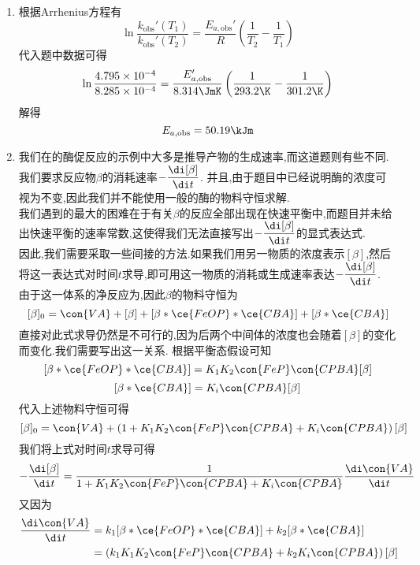 \documentclass{ctexart}
\begin{document}
\begin{solution}
    \begin{enumerate}[label=\tbf{\arabic{Pcounter}-\arabic*},topsep=0pt,parsep=0pt,itemsep=0pt,partopsep=0pt]
        \item 根据Arrhenius方程有
            \[\ln\dfrac{k_{\text{obs}}'\left(T_1\right)}{k_{\text{obs}}'\left(T_2\right)}=\dfrac{E_{a,\text{obs}}'}{R}\left(\dfrac{1}{T_2}-\dfrac{1}{T_1}\right)\]
            代入题中数据可得
            \[\ln\dfrac{4.795\times10^{-4}}{8.285\times10^{-4}}=\dfrac{E_{a,\text{obs}}'}{8.314\JmK}\left(\dfrac{1}{293.2\K}-\dfrac{1}{301.2\K}\right)\]
            解得
            \[E_{a,\text{obs}}=50.19\kJm\]
        \item 我们在的酶促反应的示例中大多是推导产物的生成速率,而这道题则有些不同.我们要求反应物$\beta$的消耗速率$-\dfrac{\di[\beta]}{\di t}$.%
            并且,由于题目中已经说明酶的浓度可视为不变,因此我们并不能使用一般的酶的物料守恒求解.\\
            我们遇到的最大的困难在于有关$\beta$的反应全部出现在快速平衡中,而题目并未给出快速平衡的速率常数,这使得我们无法直接写出$-\dfrac{\di[\beta]}{\di t}$的显式表达式.\\
            因此,我们需要采取一些间接的方法.如果我们用另一物质的浓度表示$[\beta]$,然后将这一表达式对时间$t$求导,即可用这一物质的消耗或生成速率表达$-\dfrac{\di[\beta]}{\di t}$.\\
            由于这一体系的净反应为,因此$\beta$的物料守恒为
            \[[\beta]_0=\con{VA}+[\beta]+[\beta\ast\ce{FeOP}\ast\ce{CBA}]+[\beta\ast\ce{CBA}]\]
            直接对此式求导仍然是不可行的,因为后两个中间体的浓度也会随着$[\beta]$的变化而变化.我们需要写出这一关系.%
            根据平衡态假设可知
            \[[\beta\ast\ce{FeOP}\ast\ce{CBA}]=K_1K_2\con{FeP}\con{CPBA}[\beta]\]
            \[[\beta\ast\ce{CBA}]=K_i\con{CPBA}[\beta]\]
            代入上述物料守恒可得
            \[[\beta]_0=\con{VA}+\left(1+K_1K_2\con{FeP}\con{CPBA}+K_i\con{CPBA}\right)[\beta]\]
            我们将上式对时间$t$求导可得
            \[-\dfrac{\di[\beta]}{\di t}=\dfrac{1}{1+K_1K_2\con{FeP}\con{CPBA}+K_i\con{CPBA}}\dfrac{\di\con{VA}}{\di t}\]
            又因为
            \[\begin{aligned}
                \dfrac{\di\con{VA}}{\di t}
                &= k_1[\beta\ast\ce{FeOP}\ast\ce{CBA}]+k_2[\beta\ast\ce{CBA}] \\
                &= \left(k_1K_1K_2\con{FeP}\con{CPBA}+k_2K_i\con{CPBA}\right)[\beta]
            \end{aligned}\]

\end{enumerate}
\end{solution}
\end{document}
